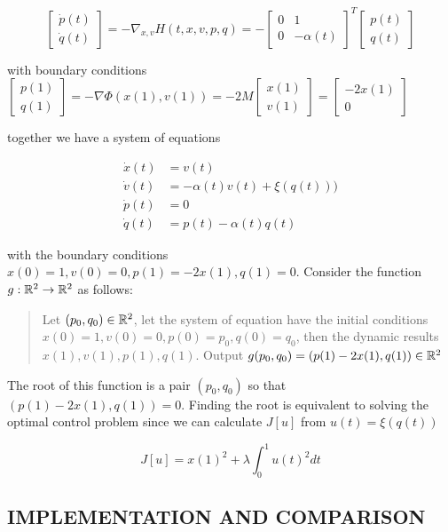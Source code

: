 $$
	\begin{bmatrix}
		\dot{p}(t) \\
		\dot{q}(t)
	\end{bmatrix} = -\nabla_{x, v} H(t, x, v, p, q) = - \begin{bmatrix}
		0 & 1 \\
		0 & -\alpha(t)
	\end{bmatrix}^T \begin{bmatrix}
		p(t) \\ 
		q(t)
	\end{bmatrix}
$$

with boundary conditions $\begin{bmatrix}
	p(1) \\
	q(1)
\end{bmatrix} = - \nabla \Phi (x(1), v(1)) = - 2 M \begin{bmatrix}
	x(1) \\
	v(1)
\end{bmatrix} = \begin{bmatrix}
	- 2 x(1) \\
	0
\end{bmatrix}$
 
 together we have a system of equations

\begin{align*}
	\dot{x}(t) &= v(t) \\
	\dot{v}(t) &= -\alpha(t) v(t) + \xi(q(t))) \\
	\dot{p}(t) &= 0 \\
	\dot{q}(t) &= p(t) - \alpha(t) q(t)
\end{align*}

with the boundary conditions $x(0) = 1, v(0) = 0, p(1) = - 2 x(1), q(1) = 0$. Consider the function $g: \mathbb{R}^2 \to \mathbb{R}^2$ as follows:

\begin{quote}
	Let $(p_0, q_0) \in \mathbb{R}^2$, let the system of equation have the initial conditions $x(0) = 1, v(0) = 0, p(0) = p_0, q(0) = q_0$, then the dynamic results $x(1), v(1), p(1), q(1)$. Output $g(p_0, q_0) = (p(1) - 2x(1), q(1)) \in \mathbb{R}^2$
\end{quote}


The root of this function is a pair $(p_0, q_0)$ so that $(p(1) - 2x(1), q(1)) = 0$. Finding the root is equivalent to solving the optimal control problem since we can calculate $J[u]$ from $u(t) = \xi(q(t))$

$$
	J[u] = x(1)^2 + \lambda \int_0^1 u(t)^2 dt
$$

\subsection{IMPLEMENTATION AND COMPARISON}

